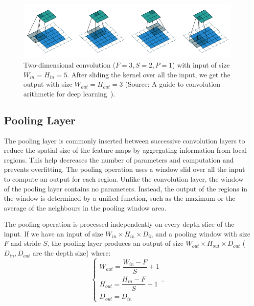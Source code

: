 \begin{figure}[h!]
    \centering
    \includegraphics[width=\linewidth]{content/resources/images/background/convolution.png}
    \caption{Two-dimensional convolution ($F=3, S = 2, P = 1$) with input of size $W_{in} = H_{in} = 5$. After sliding the kernel over all the input, we get the output with size  $W_{out} = H_{out} = 3$ (Source: A guide to convolution arithmetic for deep learning~\cite{Dumoulin-ArXiv2016-Guide}).}
    \label{fig:chapter2-convolution}
\end{figure}

\subsection{Pooling Layer}
The pooling layer is commonly inserted between successive convolution layers to reduce the spatial size of the feature maps by aggregating information from local regions. This help decreases the number of parameters and computation and prevents overfitting. The pooling operation uses a window slid over all the input to compute an output for each region. Unlike the convolution layer, the window of the pooling layer contains no parameters. Instead, the output of the regions in the window is determined by a unified function, such as the maximum or the average of the neighbours in the pooling window area. 

The pooling operation is processed independently on every depth slice of the input. If we have an input of size $W_{in} \times H_{in} \times D_{in}$ and a pooling window with size $F$ and stride $S$, the pooling layer produces an output of size $W_{out} \times H_{out} \times D_{out}$ ($D_{in}, D_{out}$ are the depth size) where:
\begin{equation}
    \begin{cases} 
        W_{out} = \dfrac{W_{in} - F}{S} + 1 \\ 
        H_{out} = \dfrac{H_{in} - F}{S} + 1 \\
        D_{out} = D_{in}
    \end{cases}.
\end{equation}

